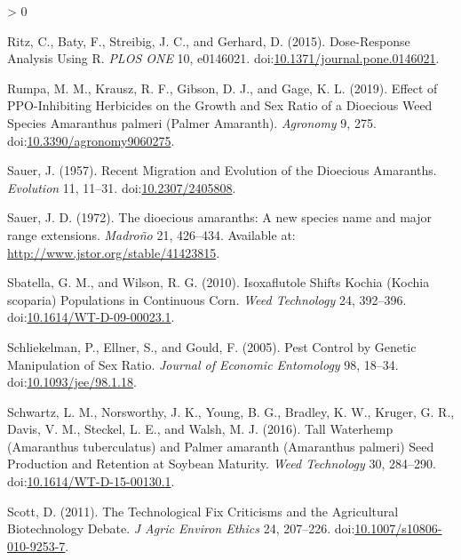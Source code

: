 \documentclass[utf8]{frontiersSCNS}
\newlength{\cslhangindent}
\newenvironment{CSLReferences}[2] %
 {%
  \setlength{\parindent}{0pt}
  \ifodd #1 \everypar{\setlength{\hangindent}{\cslhangindent}}\ignorespaces\fi
  \ifnum #2 > 0
  \setlength{\parskip}{#2\baselineskip}
  \fi
 }%
 {}
\begin{document}
\begin{CSLReferences}{1}{0}
\leavevmode\hypertarget{ref-ritz2015}{}%
Ritz, C., Baty, F., Streibig, J. C., and Gerhard, D. (2015).
Dose-{Response Analysis Using R}. \emph{PLOS ONE} 10, e0146021.
doi:\href{https://doi.org/10.1371/journal.pone.0146021}{10.1371/journal.pone.0146021}.

\leavevmode\hypertarget{ref-rumpa2019}{}%
Rumpa, M. M., Krausz, R. F., Gibson, D. J., and Gage, K. L. (2019).
Effect of {PPO}-{Inhibiting Herbicides} on the {Growth} and {Sex Ratio}
of a {Dioecious Weed Species Amaranthus} palmeri ({Palmer Amaranth}).
\emph{Agronomy} 9, 275.
doi:\href{https://doi.org/10.3390/agronomy9060275}{10.3390/agronomy9060275}.

\leavevmode\hypertarget{ref-sauer1957}{}%
Sauer, J. (1957). Recent {Migration} and {Evolution} of the {Dioecious
Amaranths}. \emph{Evolution} 11, 11--31.
doi:\href{https://doi.org/10.2307/2405808}{10.2307/2405808}.

\leavevmode\hypertarget{ref-sauer1972}{}%
Sauer, J. D. (1972). The dioecious amaranths: A new species name and
major range extensions. \emph{Madroño} 21, 426--434. Available at:
\url{http://www.jstor.org/stable/41423815}.

\leavevmode\hypertarget{ref-sbatella2010}{}%
Sbatella, G. M., and Wilson, R. G. (2010). Isoxaflutole {Shifts Kochia}
({Kochia} scoparia) {Populations} in {Continuous Corn}. \emph{Weed
Technology} 24, 392--396.
doi:\href{https://doi.org/10.1614/WT-D-09-00023.1}{10.1614/WT-D-09-00023.1}.

\leavevmode\hypertarget{ref-schliekelman2005}{}%
Schliekelman, P., Ellner, S., and Gould, F. (2005). Pest {Control} by
{Genetic Manipulation} of {Sex Ratio}. \emph{Journal of Economic
Entomology} 98, 18--34.
doi:\href{https://doi.org/10.1093/jee/98.1.18}{10.1093/jee/98.1.18}.

\leavevmode\hypertarget{ref-schwartz2016}{}%
Schwartz, L. M., Norsworthy, J. K., Young, B. G., Bradley, K. W.,
Kruger, G. R., Davis, V. M., Steckel, L. E., and Walsh, M. J. (2016).
Tall {Waterhemp} ({Amaranthus} tuberculatus) and {Palmer} amaranth
({Amaranthus} palmeri) {Seed Production} and {Retention} at {Soybean
Maturity}. \emph{Weed Technology} 30, 284--290.
doi:\href{https://doi.org/10.1614/WT-D-15-00130.1}{10.1614/WT-D-15-00130.1}.

\leavevmode\hypertarget{ref-scott2011}{}%
Scott, D. (2011). The {Technological Fix Criticisms} and the
{Agricultural Biotechnology Debate}. \emph{J Agric Environ Ethics} 24,
207--226.
doi:\href{https://doi.org/10.1007/s10806-010-9253-7}{10.1007/s10806-010-9253-7}.


\end{CSLReferences}
\end{document}
